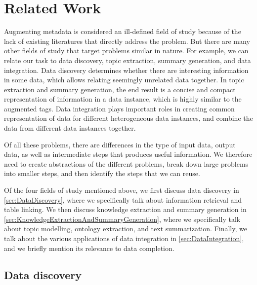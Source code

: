 
\chapter{Related Work}
\label{ch:RelatedWork}

Augmenting metadata is considered an ill-defined field of study because of the lack of existing literatures that directly address the problem. But there are many other fields of study that target problems similar in nature. For example, we can relate our task to data discovery, topic extraction, summary generation, and data integration. Data discovery determines whether there are interesting information in some data, which allows relating seemingly unrelated data together. In topic extraction and summary generation, the end result is a concise and compact representation of information in a data instance, which is highly similar to the augmented tags. Data integration plays important roles in creating common representation of data for different heterogeneous data instances, and combine the data from different data instances together.

Of all these problems, there are differences in the type of input data, output data, as well as intermediate steps that produces useful information. We therefore need to create abstractions of the different problems, break down large problems into smaller steps, and then identify the steps that we can reuse.

Of the four fields of study mentioned above, we first discuss data discovery in \autoref{sec:DataDiscovery}, where we specifically talk about information retrieval and table linking. We then discuss knowledge extraction and summary generation in \autoref{sec:KnowledgeExtractionAndSummaryGeneration}, where we specifically talk about topic modelling, ontology extraction, and text summarization. Finally, we talk about the various applications of data integration in \autoref{sec:DataIntegration}, and we briefly mention its relevance to data completion.

\section{Data discovery}
\label{sec:DataDiscovery}

